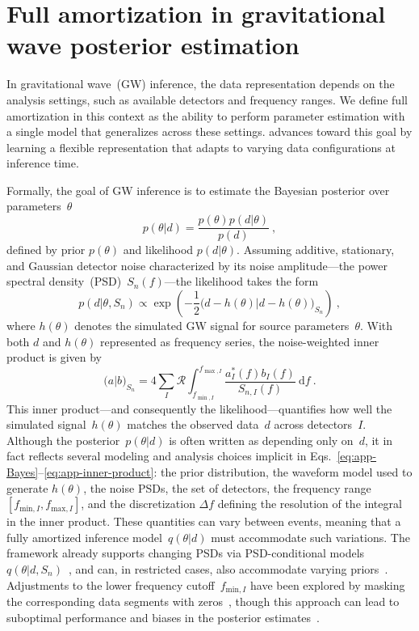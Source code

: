 \section{Full amortization in gravitational wave posterior estimation}
In gravitational wave~(GW) inference, the data representation depends on the analysis settings, such as available detectors and frequency ranges. 
We define full amortization in this context as the ability to perform parameter estimation with a single model that generalizes across these settings. 
\dingoT advances toward this goal by learning a flexible representation that adapts to varying data configurations at inference time.

Formally, the goal of GW inference is to estimate the Bayesian posterior over parameters~$\theta$
\begin{equation}\label{eq:app-Bayes}
    p(\theta | d) = \frac{p(\theta)p(d | \theta)}{p(d)}~,
\end{equation}
defined by prior $p(\theta)$ and likelihood $p(d|\theta)$. 
Assuming additive, stationary, and Gaussian detector noise characterized by its noise amplitude---the power spectral density~(PSD)~$S_n(f)$---the likelihood takes the form
\begin{equation}
    p(d|\theta, S_n) \propto \exp \left( - \frac{1}{2} \big(d-h(\theta) | d- h(\theta)\big)_{S_n} \right)~,
\end{equation}
where $h(\theta)$ denotes the simulated GW signal for source parameters~$\theta$.
With both $d$ and $h(\theta)$ represented as frequency series, the noise-weighted inner product is given by
\begin{equation}\label{eq:app-inner-product}
    \big( a | b \big)_{S_n} = 4 \sum_I \mathcal{R} \int_{f_{\min, I}}^{f_{\max, I}} \frac{a_I^*(f) b_I (f)}{S_{n, I}(f)} ~\mathrm{d}f~.
\end{equation}
This inner product---and consequently the likelihood---quantifies how well the simulated signal~$h(\theta)$ matches the observed data~$d$ across detectors~$I$.
Although the posterior~$p(\theta | d)$ is often written as depending only on~$d$, it in fact reflects several modeling and analysis choices implicit in Eqs.~\eqref{eq:app-Bayes}--\eqref{eq:app-inner-product}: the prior distribution, the waveform model used to generate $h(\theta)$, the noise PSDs, the set of detectors, the frequency range~$[f_{\mathrm{min}, I}, f_{\mathrm{max}, I}]$, and the discretization $\Delta f$ defining the resolution of the integral in the inner product. 
These quantities can vary between events, meaning that a fully amortized inference model~$q(\theta|d)$ must accommodate such variations.
The \dingo framework already supports changing PSDs via PSD-conditional models~$q(\theta|d,S_n)$~\cite{dax_dingo:2021}, and can, in restricted cases, also accommodate varying priors~\cite{dax_bns:2025}.
Adjustments to the lower frequency cutoff~$f_{\mathrm{min},I}$ have been explored by masking the corresponding data segments with zeros~\cite{dax_bns:2025}, though this approach can lead to suboptimal performance and biases in the posterior estimates~\citep{wang_missing_data:2024, verma:2025}.

